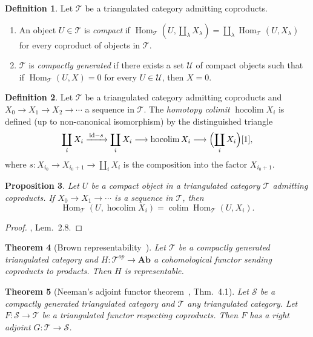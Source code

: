 \documentclass[12pt,a4paper]{article}
\newtheorem{theorem}{Theorem}[section]
\newtheorem{proposition}[theorem]{Proposition}
\theoremstyle{definition}
\newtheorem{definition}[theorem]{Definition}
\newcommand{\Ab}{\mathbf{Ab}}
\newcommand{\hocolim}{\operatorname*{hocolim}}
\newcommand{\colim}{\operatorname*{colim}}
\newcommand{\Hom}{\operatorname{Hom}}
\newcommand{\id}{\mathrm{id}}
\begin{document}
\begin{definition}\label{def:compactly-generated}
Let $\mathcal{T}$ be a triangulated category admitting coproducts.
\begin{enumerate}
  \item An object $U\in\mathcal{T}$ is \emph{compact} if
    $\Hom_\mathcal{T}(U,\coprod_\lambda X_\lambda)
    =\coprod_\lambda\Hom_\mathcal{T}(U,X_\lambda)$
    for every coproduct of objects in $\mathcal{T}$.
  \item $\mathcal{T}$ is \emph{compactly generated} if there exists a set
    $\mathcal{U}$ of compact objects such that if
    $\Hom_\mathcal{T}(U,X)=0$ for every $U\in\mathcal{U}$, then $X=0$.
\end{enumerate}
\end{definition}

\begin{definition}\label{def:hocolim}
Let $\mathcal{T}$ be a triangulated category admitting coproducts and
$X_0\to X_1\to X_2\to\cdots$ a sequence in $\mathcal{T}$.  The
\emph{homotopy colimit} $\hocolim X_i$ is defined (up to non-canonical isomorphism)
by the distinguished triangle
\[
  \coprod_i X_i \xrightarrow{\,\id-s\,} \coprod_i X_i \longrightarrow \hocolim X_i
  \longrightarrow \Bigl(\coprod_i X_i\Bigr)[1],
\]
where $s:X_{i_0}\to X_{i_0+1}\to\coprod_i X_i$ is the composition into the factor
$X_{i_0+1}$.
\end{definition}

\begin{proposition}\label{prop:compact-hocolim}
Let $U$ be a compact object in a triangulated category $\mathcal{T}$ admitting
coproducts.  If $X_0\to X_1\to\cdots$ is a sequence in $\mathcal{T}$, then
\[
  \Hom_\mathcal{T}(U,\hocolim X_i) = \colim\Hom_\mathcal{T}(U,X_i).
\]
\end{proposition}
\begin{proof}
\cite{Nee96}, Lem.\ 2.8.
\end{proof}

\begin{theorem}[Brown representability~\cite{Nee96}]\label{thm:Brown}
Let $\mathcal{T}$ be a compactly generated triangulated category and
$H:\mathcal{T}^{op}\to\Ab$ a cohomological functor sending coproducts to products.
Then $H$ is representable.
\end{theorem}

\begin{theorem}[Neeman's adjoint functor theorem~\cite{Nee96}, Thm.\ 4.1]\label{thm:Neeman}
Let $\mathcal{S}$ be a compactly generated triangulated category and $\mathcal{T}$
any triangulated category.  Let $F:\mathcal{S}\to\mathcal{T}$ be a triangulated
functor respecting coproducts.  Then $F$ has a right adjoint
$G:\mathcal{T}\to\mathcal{S}$.
\end{theorem}
\end{document}
